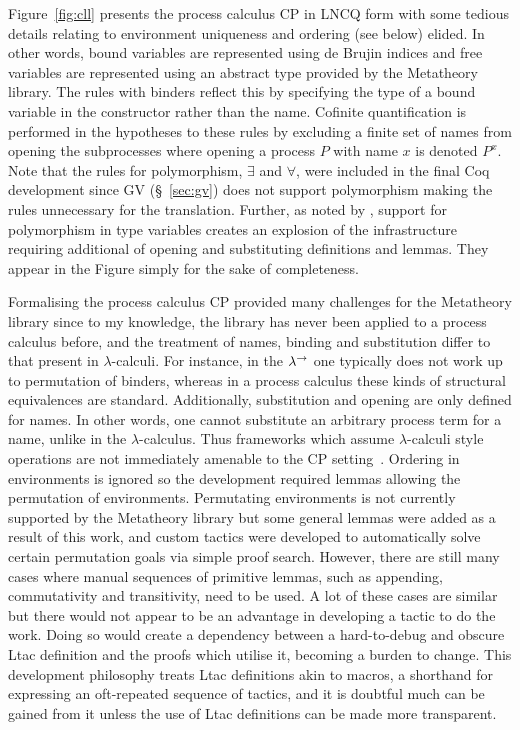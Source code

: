 Figure~\ref{fig:cll} presents the process calculus CP in LNCQ form with some
tedious details relating to environment uniqueness and ordering (see below)
elided. In other words, bound variables are represented using de Brujin
indices and free variables are represented using an abstract type provided by
the Metatheory library. The rules with binders reflect this by specifying the
type of a bound variable in the constructor rather than the name. Cofinite
quantification is performed in the hypotheses to these rules by excluding a
finite set of names from opening the subprocesses where opening a process $P$
with name $x$ is denoted $P^x$. Note that the rules for polymorphism,
$\exists$ and $\forall$, were included in the final Coq development since GV
(\S~\ref{sec:gv}) does not support polymorphism making the rules unnecessary
for the translation. Further, as noted by \citeauthor{Lee:2012}, support for
polymorphism in type variables creates an explosion of the infrastructure
requiring additional of opening and substituting definitions and lemmas. They
appear in the Figure simply for the sake of completeness.

Formalising the process calculus CP provided many challenges for the
Metatheory library since to my knowledge, the library has never been applied
to a process calculus before, and the treatment of names, binding and
substitution differ to that present in $\lambda$-calculi. For instance, in the
$\lambda^\rightarrow$ one typically does not work up to permutation of binders, whereas in a
process calculus these kinds of structural equivalences are
standard. Additionally, substitution and opening are only defined for
names. In other words, one cannot substitute an arbitrary process term for a
name, unlike in the $\lambda$-calculus. Thus frameworks which assume
$\lambda$-calculi style operations are not immediately amenable to the CP
setting~\cite{Lee:2012}. Ordering in environments is ignored so the
development required lemmas allowing the permutation of
environments. Permutating environments is not currently supported by the
Metatheory library but some general lemmas were added as a result of this
work, and custom tactics were developed to automatically solve certain
permutation goals via simple proof search. However, there are still many cases
where manual sequences of primitive lemmas, such as appending, commutativity
and transitivity, need to be used. A lot of these cases are similar but there
would not appear to be an advantage in developing a tactic to do the
work. Doing so would create a dependency between a hard-to-debug and obscure
Ltac definition and the proofs which utilise it, becoming a burden to
change. This development philosophy treats Ltac definitions akin to macros, a
shorthand for expressing an oft-repeated sequence of tactics, and it is
doubtful much can be gained from it unless the use of Ltac definitions can be
made more transparent.

